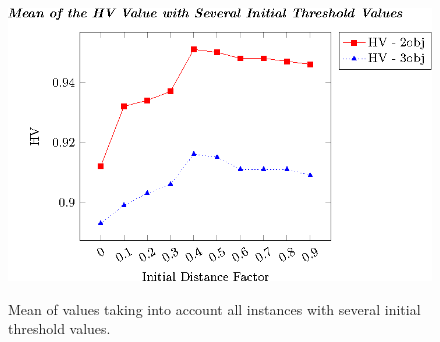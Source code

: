 \begin{figure}[t]
\centering
\includegraphics[]{Images/Graphic-Initial-Distance_tikz-figure0.eps} \\
%
\caption{Mean of \HV{} values taking into account all instances with several initial threshold values.}\label{fig:Initial-distance-factor}
\end{figure}





%
%


%
%
